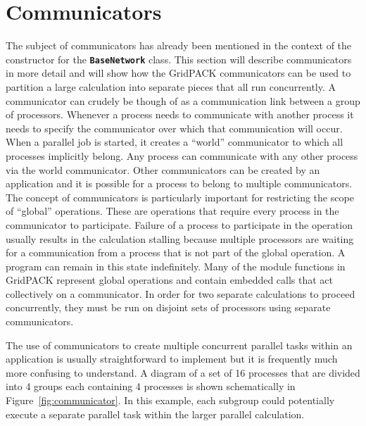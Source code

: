 \section{Communicators}

The subject of communicators has already been mentioned in the context of the constructor for the \texttt{\textbf{BaseNetwork}} class. This section will describe communicators in more detail and will show how the GridPACK communicators can be used to partition a large calculation into separate pieces that all run concurrently. A communicator can crudely be though of as a communication link between a group of processors. Whenever a process needs to communicate with another process it needs to specify the communicator over which that communication will occur. When a parallel job is started, it creates a ``world'' communicator to which all processes implicitly belong. Any process can communicate with any other process via the world communicator. Other communicators can be created by an application and it is possible for a process to belong to multiple communicators. The concept of communicators is particularly important for restricting the scope of ``global'' operations. These are operations that require every process in the communicator to participate. Failure of a process to participate in the operation usually results in the calculation stalling because multiple processors are waiting for a communication from a process that is not part of the global operation. A program can remain in this state indefinitely. Many of the module functions in GridPACK represent global operations and contain embedded calls that act collectively on a communicator. In order for two separate calculations to proceed concurrently, they must be run on disjoint sets of processors using separate communicators.

The use of communicators to create multiple concurrent parallel tasks within an
application is usually straightforward to implement but it is frequently much
more confusing to understand. A diagram of a set of 16 processes that are
divided into 4 groups each containing 4 processes is shown schematically in
Figure~\ref{fig:communicator}. In this example, each subgroup could potentially execute a separate parallel task within the larger parallel calculation.



